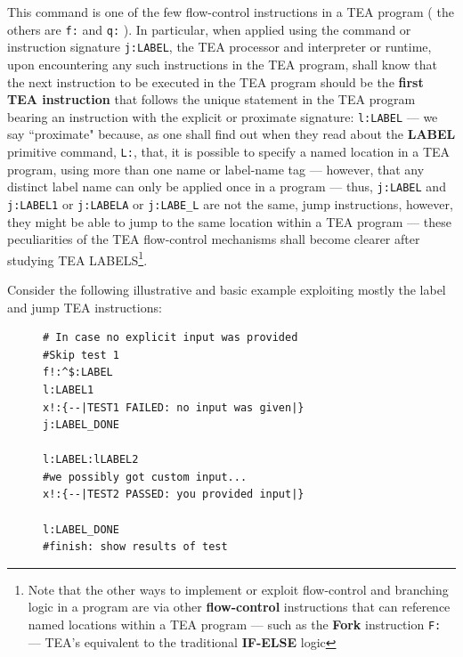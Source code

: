 \documentclass[a4paper, 18pt]{book} %
\begin{document}
This command is one of the few flow-control instructions in a TEA program ( the others are \texttt{f:} and \texttt{q:} ). In particular, when applied using the command or instruction signature \texttt{j:LABEL}, the TEA processor and interpreter or runtime, upon encountering any such instructions in the TEA program, shall know that the next instruction to be executed in the TEA program should be the \textbf{first TEA instruction} that follows the unique statement in the TEA program bearing an instruction with the explicit or proximate signature: \texttt{l:LABEL} --- we say ``proximate" because, as one shall find out when they read about the \textbf{LABEL} primitive command, \texttt{L:}, that, it is possible to specify a named location in a TEA program, using more than one name or label-name tag --- however, that any distinct label name can only be applied once in a program --- thus, \texttt{j:LABEL} and \texttt{j:LABEL1} or \texttt{j:LABELA} or \texttt{j:LABE\_L} are not the same, jump instructions, however, they might be able to jump to the same location within a TEA program --- these peculiarities of the TEA flow-control mechanisms shall become clearer after studying TEA LABELS\footnote{Note that the other ways to implement or exploit flow-control and branching logic in a program are via other \textbf{flow-control} instructions that can reference named locations within a TEA program --- such as the \textbf{Fork} instruction \texttt{F:} --- TEA's equivalent to the traditional \textbf{IF-ELSE} logic}.


\vspace{2em}

Consider the following illustrative and basic example exploiting mostly the label and jump TEA instructions:

\vspace{2em}


\begin{figure}[H]
 \Large
  \centering
  \begin{tcolorbox}[teaterminalstyle, title=J: EXAMPLE 1]
  \begin{lstlisting}[language=TEA]
# In case no explicit input was provided
#Skip test 1
f!:^$:LABEL
l:LABEL1
x!:{--|TEST1 FAILED: no input was given|}
j:LABEL_DONE

l:LABEL:lLABEL2
#we possibly got custom input...
x!:{--|TEST2 PASSED: you provided input|}

l:LABEL_DONE
#finish: show results of test
   \end{lstlisting}
  \end{tcolorbox}
\end{figure}
\end{document}
